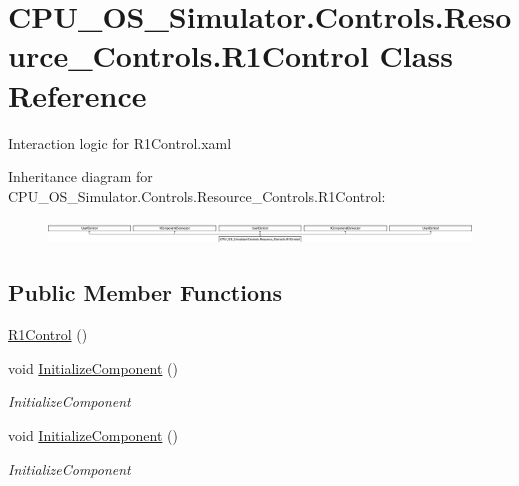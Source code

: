 \hypertarget{class_c_p_u___o_s___simulator_1_1_controls_1_1_resource___controls_1_1_r1_control}{}\section{C\+P\+U\+\_\+\+O\+S\+\_\+\+Simulator.\+Controls.\+Resource\+\_\+\+Controls.\+R1\+Control Class Reference}
\label{class_c_p_u___o_s___simulator_1_1_controls_1_1_resource___controls_1_1_r1_control}


Interaction logic for R1\+Control.\+xaml  


Inheritance diagram for C\+P\+U\+\_\+\+O\+S\+\_\+\+Simulator.\+Controls.\+Resource\+\_\+\+Controls.\+R1\+Control\+:\begin{figure}[H]
\begin{center}
\leavevmode
\includegraphics[height=0.636364cm]{class_c_p_u___o_s___simulator_1_1_controls_1_1_resource___controls_1_1_r1_control}
\end{center}
\end{figure}
\subsection*{Public Member Functions}
\begin{DoxyCompactItemize}
\item 
\hyperlink{class_c_p_u___o_s___simulator_1_1_controls_1_1_resource___controls_1_1_r1_control_af02c55b4fcbf6baa5c8f4a49cafaaa84}{R1\+Control} ()
\item 
void \hyperlink{class_c_p_u___o_s___simulator_1_1_controls_1_1_resource___controls_1_1_r1_control_af354773a381c1d4f070eba628ee36bc2}{Initialize\+Component} ()
\begin{DoxyCompactList}\small\item\em Initialize\+Component \end{DoxyCompactList}\item 
void \hyperlink{class_c_p_u___o_s___simulator_1_1_controls_1_1_resource___controls_1_1_r1_control_af354773a381c1d4f070eba628ee36bc2}{Initialize\+Component} ()
\begin{DoxyCompactList}\small\item\em Initialize\+Component \end{DoxyCompactList}\end{DoxyCompactItemize}
